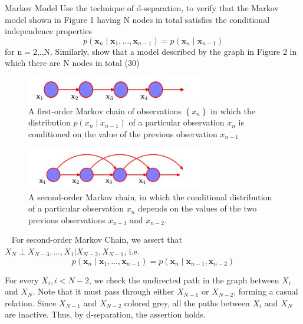 \begin{exercise}[]{Markov Model Use the technique of d-separation, to verify that the Markov model shown in Figure 1 having $\mathrm{N}$ nodes in total satisfies the conditional independence properties
    $$
    p\left(\boldsymbol{x}_{n} \mid \boldsymbol{x}_{1}, \ldots, \boldsymbol{x}_{n-1}\right)=p\left(\boldsymbol{x}_{n} \mid \boldsymbol{x}_{n-1}\right)
    $$
    for $\mathrm{n}=2$,.,N. Similarly, show that a model described by the graph in Figure 2 in which there are $\mathrm{N}$ nodes in total (30)

    \begin{figure}[h]
        \centering
        \includegraphics[width=8cm]{img/ex3-2.jpg}
        \caption{A first-order Markov chain of observations $\left\{x_{n}\right\}$ in which the distribution $p\left(x_{n} \mid x_{n-1}\right)$ of a particular observation $x_{n}$ is conditioned on the value of the previous observation $x_{n-1}$}
    \end{figure}

    \begin{figure}[h]
        \centering
        \includegraphics[width=8cm]{img/ex3-3.jpg}
        \caption{A second-order Markov chain, in which the conditional distribution of a particular observation $x_{n}$ depends on the values of the two previous observations $x_{n-1}$ and $x_{n-2}$.
        }
    \end{figure}
    
    }
  \begin{solution}
  \par{~}
  For second-order Markov Chain, we assert that $X_{N} \perp X_{N-3}, \ldots, X_{1} | X_{N-2}, X_{N-1}$, i.e. 
  $$
    p\left(\boldsymbol{x}_{n} \mid \boldsymbol{x}_{1}, \ldots, \boldsymbol{x}_{n-1}\right)=p\left(\boldsymbol{x}_{n} \mid \boldsymbol{x}_{n-1}, \boldsymbol{x}_{n-2}\right)
    $$
  \end{solution}

  For every $X_i, i < N - 2$, we check the undirected path in the graph between $X_i$ and $X_N$. Note that it must pass through either $X_{N-1}$ or $X_{N-2}$, forming a casual relation. Since $X_{N-1}$ and $X_{N-2}$ colored grey, all the paths between $X_i$ and $X_N$ are inactive. Thus, by d-separation, the assertion holds.
  \label{ex2}
\end{exercise}


